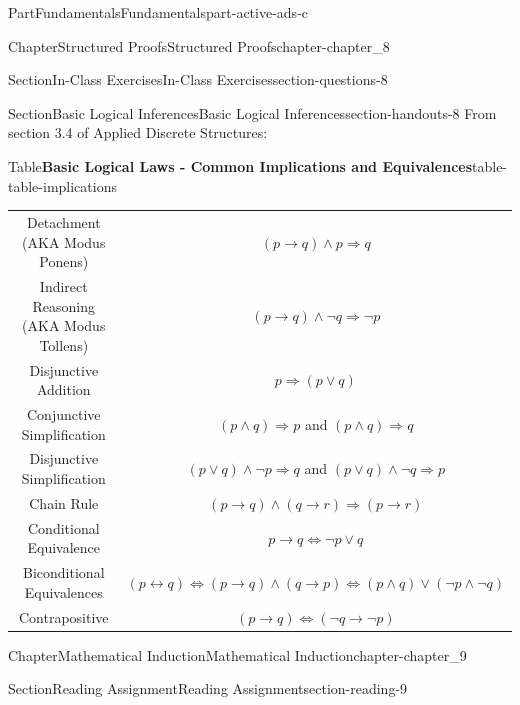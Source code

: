 \documentclass[oneside,10pt,]{book}
\newcommand{\tabularfont}{\relax}
\numberwithin{equation}{section}
\newcommand{\hrulemedium}{\noalign{\hrule height 0.07em}}
\begin{document}
\begin{partptx}{Part}{Fundamentals}{}{Fundamentals}{}{}{part-active-ads-c}
\begin{chapterptx}{Chapter}{Structured Proofs}{}{Structured Proofs}{}{}{chapter-chapter_8}
\begin{sectionptx}{Section}{In-Class Exercises}{}{In-Class Exercises}{}{}{section-questions-8}
\end{sectionptx}
%
%
\typeout{************************************************}
\typeout{************************************************}
%
\begin{sectionptx}{Section}{Basic Logical Inferences}{}{Basic Logical Inferences}{}{}{section-handouts-8}
From section 3.4 of Applied Discrete Structures:%
\begin{tableptx}{Table}{\textbf{Basic Logical Laws - Common Implications and Equivalences}}{table-table-implications}{}%
%
%
%
%
\centering%
{\tabularfont%
\begin{tabular}{cc}
Detachment (AKA Modus Ponens)&\((p \rightarrow  q) \land  p\Rightarrow  q\)\tabularnewline\hrulemedium
Indirect Reasoning (AKA Modus Tollens)&\((p \to  q) \land  \neg q \Rightarrow  \neg p\)\tabularnewline\hrulemedium
Disjunctive Addition&\(p\Rightarrow (p\lor q)\)\tabularnewline\hrulemedium
Conjunctive Simplification&\((p \land  q) \Rightarrow  p\) and \((p \land  q) \Rightarrow  q\)\tabularnewline\hrulemedium
Disjunctive Simplification&\((p \lor  q) \land  \neg p \Rightarrow  q\) and \((p \lor q) \land \neg q\Rightarrow p\)\tabularnewline\hrulemedium
Chain Rule&\((p \to  q) \land  ( q \rightarrow  r) \Rightarrow  (p\to  r)\)\tabularnewline\hrulemedium
Conditional Equivalence&\(p \rightarrow  q \Leftrightarrow  \neg p \lor  q\)\tabularnewline\hrulemedium
Biconditional Equivalences&\((p \leftrightarrow  q) \Leftrightarrow  (p\rightarrow q) \land  (q \rightarrow  p)\Leftrightarrow (p \land  q) \lor  (\neg p \land  \neg q)\)\tabularnewline\hrulemedium
Contrapositive&\((p\to q) \Leftrightarrow (\neg q \to \neg p)\)
\end{tabular}
}%
\end{tableptx}%
\end{sectionptx}
\end{chapterptx}
%
\typeout{************************************************}
\typeout{************************************************}
%
\begin{chapterptx}{Chapter}{Mathematical Induction}{}{Mathematical Induction}{}{}{chapter-chapter_9}
\renewcommand*{\chaptername}{Chapter}
\index{}%
%
%
\typeout{************************************************}
\typeout{************************************************}
%
\begin{sectionptx}{Section}{Reading Assignment}{}{Reading Assignment}{}{}{section-reading-9}

\end{sectionptx}
\end{chapterptx}
\end{partptx}
\end{document}
